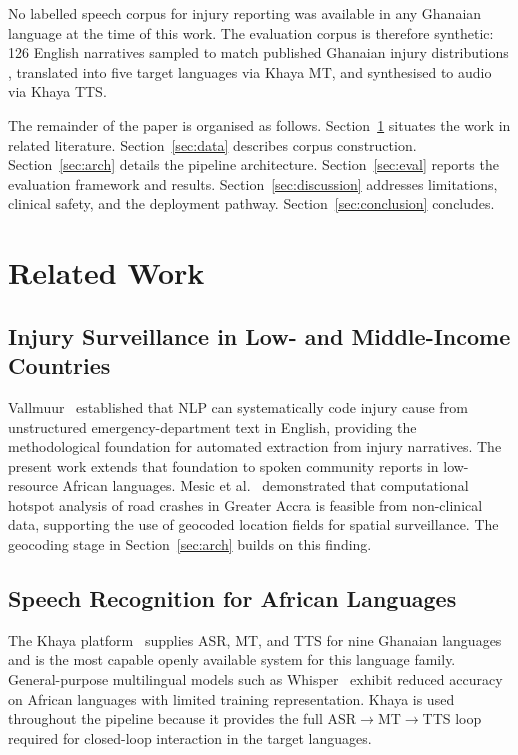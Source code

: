 \documentclass[conference]{IEEEtran}
\begin{document}
No labelled speech corpus for injury reporting was available in any
Ghanaian language at the time of this work. The evaluation corpus is
therefore synthetic: 126 English narratives sampled to match
published Ghanaian injury distributions
\cite{boateng2019,opoku2025,mesic2024}, translated into five target
languages via Khaya MT, and synthesised to audio via Khaya TTS.

The remainder of the paper is organised as follows.
Section~\ref{sec:related} situates the work in related literature.
Section~\ref{sec:data} describes corpus construction.
Section~\ref{sec:arch} details the pipeline architecture.
Section~\ref{sec:eval} reports the evaluation framework and results.
Section~\ref{sec:discussion} addresses limitations, clinical safety,
and the deployment pathway. Section~\ref{sec:conclusion} concludes.


\section{Related Work}
\label{sec:related}

\subsection{Injury Surveillance in Low- and Middle-Income Countries}
Vallmuur~\cite{vallmuur2015} established that NLP can systematically
code injury cause from unstructured emergency-department text in
English, providing the methodological foundation for automated
extraction from injury narratives. The present work extends that
foundation to spoken community reports in low-resource African
languages. Mesic et al.~\cite{mesic2024} demonstrated that
computational hotspot analysis of road crashes in Greater Accra is
feasible from non-clinical data, supporting the use of geocoded
location fields for spatial surveillance. The geocoding stage in
Section~\ref{sec:arch} builds on this finding.

\subsection{Speech Recognition for African Languages}
The Khaya platform~\cite{khaya} supplies ASR, MT, and TTS for nine
Ghanaian languages and is the most capable openly available system
for this language family. General-purpose multilingual models such as
Whisper~\cite{radford2023} exhibit reduced accuracy on African
languages with limited training representation. Khaya is used
throughout the pipeline because it provides the full
ASR$\rightarrow$MT$\rightarrow$TTS loop required for closed-loop
interaction in the target languages.
\end{document}
